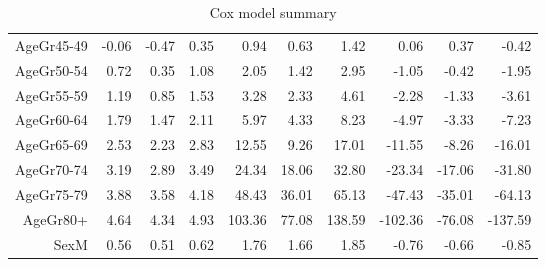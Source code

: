 \begin{table}[ht]
\begin{tabular}{rrrrrrrrrr}
  AgeGr45-49 & -0.06 & -0.47 & 0.35 & 0.94 & 0.63 & 1.42 & 0.06 & 0.37 & -0.42 \\ 
  AgeGr50-54 & 0.72 & 0.35 & 1.08 & 2.05 & 1.42 & 2.95 & -1.05 & -0.42 & -1.95 \\ 
  AgeGr55-59 & 1.19 & 0.85 & 1.53 & 3.28 & 2.33 & 4.61 & -2.28 & -1.33 & -3.61 \\ 
  AgeGr60-64 & 1.79 & 1.47 & 2.11 & 5.97 & 4.33 & 8.23 & -4.97 & -3.33 & -7.23 \\ 
  AgeGr65-69 & 2.53 & 2.23 & 2.83 & 12.55 & 9.26 & 17.01 & -11.55 & -8.26 & -16.01 \\ 
  AgeGr70-74 & 3.19 & 2.89 & 3.49 & 24.34 & 18.06 & 32.80 & -23.34 & -17.06 & -31.80 \\ 
  AgeGr75-79 & 3.88 & 3.58 & 4.18 & 48.43 & 36.01 & 65.13 & -47.43 & -35.01 & -64.13 \\ 
  AgeGr80+ & 4.64 & 4.34 & 4.93 & 103.36 & 77.08 & 138.59 & -102.36 & -76.08 & -137.59 \\ 
  SexM & 0.56 & 0.51 & 0.62 & 1.76 & 1.66 & 1.85 & -0.76 & -0.66 & -0.85 \\ 
   \hline
\end{tabular}
\caption{Cox model summary} 
\end{table}

